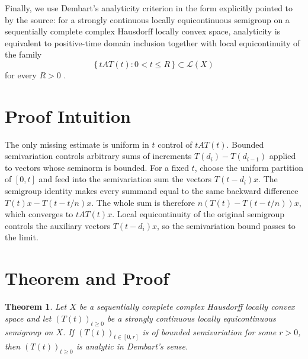 \documentclass[11pt]{article}
\newtheorem{theorem}{Theorem}
\newcommand{\cL}{\mathcal{L}}
\begin{document}
Finally, we use Dembart's analyticity criterion in the form explicitly pointed
to by the source: for a strongly continuous locally equicontinuous semigroup
on a sequentially complete complex Hausdorff locally convex space, analyticity
is equivalent to positive-time domain inclusion together with local
equicontinuity of the family
\[
  \{\,tAT(t):0<t\le R\,\}\subset \cL(X)
\]
for every $R>0$ \cite[Theorem 1, p.154]{Dembart1974}.

\section*{Proof Intuition}

The only missing estimate is uniform in $t$ control of $tAT(t)$.  Bounded
semivariation controls arbitrary sums of increments
$T(d_i)-T(d_{i-1})$ applied to vectors whose seminorm is bounded.  For a fixed
$t$, choose the uniform partition of $[0,t]$ and feed into the semivariation
sum the vectors $T(t-d_i)x$.  The semigroup identity makes every summand equal
to the same backward difference $T(t)x-T(t-t/n)x$.  The whole sum is therefore
$n(T(t)-T(t-t/n))x$, which converges to $tAT(t)x$.  Local equicontinuity of the
original semigroup controls the auxiliary vectors $T(t-d_i)x$, so the
semivariation bound passes to the limit.

\section*{Theorem and Proof}

\begin{theorem}
Let $X$ be a sequentially complete complex Hausdorff locally convex space and
let $(T(t))_{t\geq0}$ be a strongly continuous locally equicontinuous semigroup
on $X$.  If $(T(t))_{t\in[0,r]}$ is of bounded semivariation for some $r>0$,
then $(T(t))_{t\geq0}$ is analytic in Dembart's sense.
\end{theorem}
\end{document}
